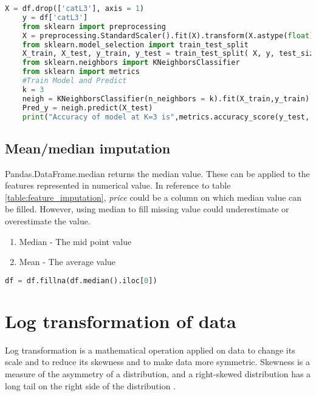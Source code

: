 \begin{lstlisting}[language=Python]
    X = df.drop(['catL3'], axis = 1)
    y = df['catL3']
    from sklearn import preprocessing
    X = preprocessing.StandardScaler().fit(X).transform(X.astype(float))
    from sklearn.model_selection import train_test_split
    X_train, X_test, y_train, y_test = train_test_split( X, y, test_size=0.2, random_state=4)
    from sklearn.neighbors import KNeighborsClassifier
    from sklearn import metrics
    #Train Model and Predict
    k = 3  
    neigh = KNeighborsClassifier(n_neighbors = k).fit(X_train,y_train)
    Pred_y = neigh.predict(X_test)
    print("Accuracy of model at K=3 is",metrics.accuracy_score(y_test, Pred_y))
\end{lstlisting}



\subsection{Mean/median imputation}

Pandas.DataFrame.median \parencite{mckinney-proc-scipy-2010} returns the median value. These can be applied to the features represented in numerical value. In reference to table \ref{table:feature_imputation}, \textit{price} could be a column on which median value can be filled. However, using median to fill missing value could underestimate or overestimate the value.

\begin{enumerate}
    \item Median - The mid point value
    \item Mean - The average value
\end{enumerate}

\begin{lstlisting}[language=Python]
    df = df.fillna(df.median().iloc[0])
\end{lstlisting}

\section{Log transformation of data}

Log transformation is a mathematical operation applied on data to change its scale and to reduce its skewness and to make data more symmetric.  Skewness is a measure of the asymmetry of a distribution, and a right-skewed distribution has a long tail on the right side of the distribution \parencite{BonnieMa}.

